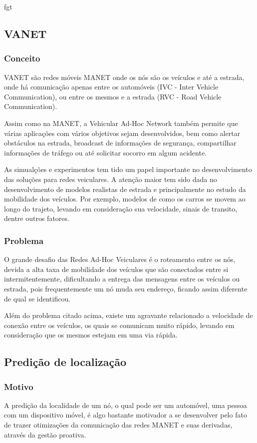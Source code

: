 fgt\documentclass[12pt, %
openright, 
oneside, %
a4paper,    %
brazil]{facom-ufu-abntex2}
\begin{document}
\subsection{VANET}
\subsubsection{Conceito}
VANET são redes móveis MANET onde os nós são os veículos e até a estrada, onde há comunicação apenas entre os automóveis (IVC - Inter Vehicle Communication), ou entre os mesmos e a estrada (RVC - Road Vehicle Communication).

Assim como na MANET, a Vehicular Ad-Hoc Network também permite que várias aplicações com vários objetivos sejam desenvolvidos, bem como alertar obstáculos na estrada, broadcast de informações de segurança, compartilhar informações de tráfego ou até solicitar socorro em algum acidente.

As simualções e experimentos tem tido um papel importante no desenvolvimento das soluções para redes veiculares. A atenção maior tem sido dada no desenvolvimento de modelos realistas de estrada e principalmente no estudo da mobilidade dos veículos. Por exemplo, modelos de como os carros se movem ao longo do trajeto, levando em consideração sua velocidade, sinais de transito, dentre outros fatores. 

\subsubsection{Problema}
O grande desafio das Redes Ad-Hoc Veiculares é o roteamento entre os nós, devida a alta taxa de mobilidade dos veículos que são conectados entre si intermitentemente, dificultando a entrega das mensagens entre os veículos ou estrada, pois frequentemente um nó muda seu endereço, ficando assim diferente de qual se identificou.

Além do problema citado acima, existe um agravante relacionado a velocidade de conexão entre os veículos, os quais se comunicam muito rápido, levando em consideração que os mesmos estejam em uma via rápida.

\subsection{Predição de localização}
\subsubsection{Motivo}
A predição da localidade de um nó, o qual pode ser um automóvel, uma pessoa com um dispositivo móvel, é algo bastante motivador a se desenvolver pelo fato de trazer otimizações da comunicação das redes MANET e suas derivadas, através da gestão proativa. \cite{6838650}
\end{document}
